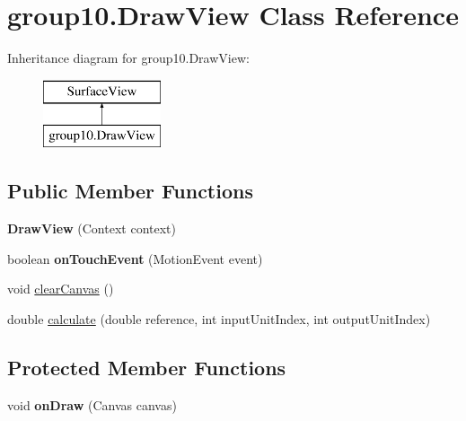 \hypertarget{classgroup10_1_1_draw_view}{}\section{group10.\+Draw\+View Class Reference}
\label{classgroup10_1_1_draw_view}
Inheritance diagram for group10.\+Draw\+View\+:\begin{figure}[H]
\begin{center}
\leavevmode
\includegraphics[height=2.000000cm]{classgroup10_1_1_draw_view}
\end{center}
\end{figure}
\subsection*{Public Member Functions}
\begin{DoxyCompactItemize}
\item 
\mbox{\label{classgroup10_1_1_draw_view_a9081a28056594f2f175ae6749eff235c}} 
{\bfseries Draw\+View} (Context context)
\item 
\mbox{\label{classgroup10_1_1_draw_view_a98e0305fd48cb1c8fb78de1b49c95700}} 
boolean {\bfseries on\+Touch\+Event} (Motion\+Event event)
\item 
void \hyperlink{classgroup10_1_1_draw_view_ab3d28bc92fb34fadb2878328f25d322e}{clear\+Canvas} ()
\item 
double \hyperlink{classgroup10_1_1_draw_view_a545ae5eccd5abcfeb8d2c7286ca6c0e7}{calculate} (double reference, int input\+Unit\+Index, int output\+Unit\+Index)
\end{DoxyCompactItemize}
\subsection*{Protected Member Functions}
\begin{DoxyCompactItemize}
\item 
\mbox{\label{classgroup10_1_1_draw_view_a14097100501238112b1bf25785bfd5b5}} 
void {\bfseries on\+Draw} (Canvas canvas)
\end{DoxyCompactItemize}
